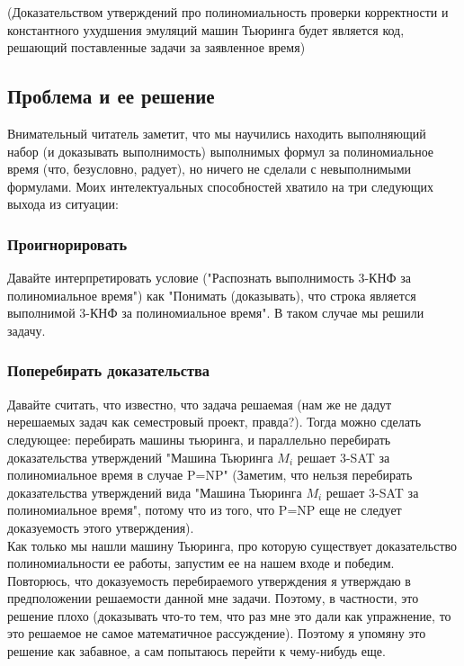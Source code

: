 \documentclass[paper=a4, fontsize=11pt]{scrartcl}
\begin{document}
(Доказательством утверждений про полиномиальность проверки корректности и
константного ухудшения эмуляций машин Тьюринга будет является код, решающий
поставленные задачи за заявленное время)


\subsection{Проблема и ее решение}


Внимательный читатель заметит, что мы научились находить выполняющий набор
(и доказывать выполнимость) выполнимых формул за полиномиальное время (что,
безусловно, радует), но ничего не сделали с невыполнимыми формулами. Моих
интелектуальных способностей хватило на три следующих выхода из ситуации:


\subsubsection{Проигнорировать}


Давайте интерпретировать условие ("Распознать выполнимость 3-КНФ за
полиномиальное время") как "Понимать (доказывать), что строка является
выполнимой 3-КНФ за полиномиальное время". В таком случае мы решили задачу.

\subsubsection{Поперебирать доказательства}


Давайте считать, что известно, что задача решаемая (нам же не дадут нерешаемых
задач как семестровый проект, правда?). Тогда можно сделать следующее:
перебирать машины тьюринга, и параллельно перебирать
доказательства утверждений "Машина Тьюринга $M_i$ решает 3-SAT за полиномиальное
время в случае P=NP" (Заметим, что нельзя перебирать доказательства утверждений
вида  "Машина Тьюринга $M_i$ решает 3-SAT за полиномиальное время",
потому что из того, что P=NP еще не следует доказуемость этого утверждения).\\


Как только мы нашли машину Тьюринга, про которую существует доказательство
полиномиальности ее работы, запустим ее на нашем входе и победим.\\

Повторюсь, что доказуемость перебираемого утверждения я утверждаю в
предположении решаемости данной мне задачи. Поэтому, в частности, это решение
плохо (доказывать что-то тем, что раз мне это дали как упражнение, то это
решаемое не самое математичное рассуждение). Поэтому я упомяну это решение как
забавное, а сам попытаюсь перейти к чему-нибудь еще.
\end{document}
